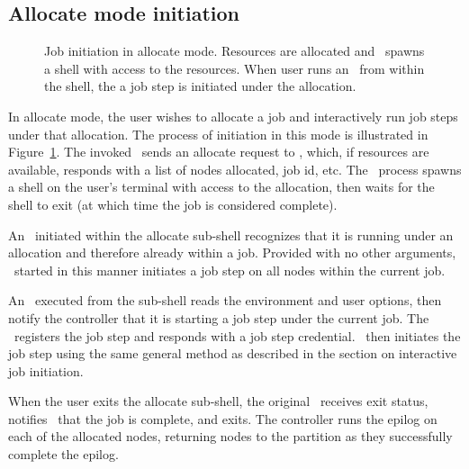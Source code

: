 \documentclass[10pt,onecolumn,times]{../common/llncs}
\begin{document}
{\subsection{Allocate mode initiation}

\begin{figure}[tb]
\centerline{ }
\caption{\small Job initiation in allocate mode. Resources are allocated and
         \srun\ spawns a shell with access to the resources. When user runs 
	 an \srun\ from within the shell, the a job step is initiated under
	 the allocation.}
\label{init-allocate}
\end{figure}

In allocate mode, the user wishes to allocate a job and interactively run
job steps under that allocation. The process of initiation in this mode
is illustrated in Figure~\ref{init-allocate}. The invoked \srun\ sends
an allocate request to \slurmctld , which, if resources are available,
responds with a list of nodes allocated, job id, etc. The \srun\ process
spawns a shell on the user's terminal with access to the allocation,
then waits for the shell to exit (at which time the job is considered
complete).

An \srun\ initiated within the allocate sub-shell recognizes that
it is running under an allocation and therefore already within a
job. Provided with no other arguments, \srun\ started in this manner
initiates a job step on all nodes within the current job. 

%

An \srun\ executed from the sub-shell reads the environment and user
options, then notify the controller that it is starting a job step under
the current job. The \slurmctld\ registers the job step and responds
with a job step credential. \srun\ then initiates the job step using the same
general method as described in the section on interactive job initiation.

When the user exits the allocate sub-shell, the original \srun\ receives
exit status, notifies \slurmctld\ that the job is complete, and exits.
The controller runs the epilog on each of the allocated nodes, returning
nodes to the partition as they successfully complete the epilog.

}
\end{document}
